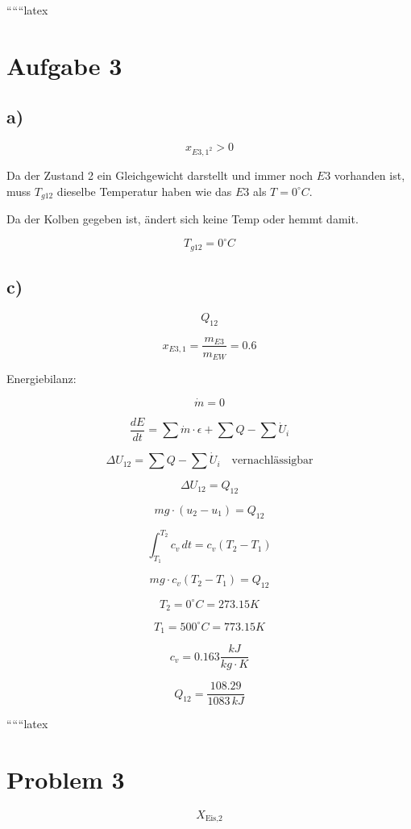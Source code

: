 ``````latex


\section*{Aufgabe 3}

\subsection*{a)}

\[ x_{E3,1^2} > 0 \]

Da der Zustand 2 ein Gleichgewicht darstellt und immer noch $E3$ vorhanden ist, muss $T_{g12}$ dieselbe Temperatur haben wie das $E3$ als $T = 0^\circ C$.

Da der Kolben gegeben ist, ändert sich keine Temp oder hemmt damit.

\[ T_{g12} = 0^\circ C \]

\subsection*{c)}

\[ Q_{12} \]

\[ x_{E3,1} = \frac{m_{E3}}{m_{EW}} = 0.6 \]

Energiebilanz:

\[ \dot{m} = 0 \]

\[ \frac{dE}{dt} = \sum \dot{m} \cdot \epsilon + \sum Q - \sum \dot{U}_i \]

\[ \Delta U_{12} = \sum Q - \sum \dot{U}_i \quad \text{vernachlässigbar} \]

\[ \Delta U_{12} = Q_{12} \]

\[ mg \cdot (u_2 - u_1) = Q_{12} \]

\[ \int_{T_1}^{T_2} c_v \, dt = c_v (T_2 - T_1) \]

\[ mg \cdot c_v (T_2 - T_1) = Q_{12} \]

\[ T_2 = 0^\circ C = 273.15 K \]

\[ T_1 = 500^\circ C = 773.15 K \]

\[ c_v = 0.163 \frac{kJ}{kg \cdot K} \]

\[ Q_{12} = \frac{108.29}{1083 \, kJ} \]

``````latex


\section*{Problem 3}

\[
X_{\text{Eis,2}}
\]

